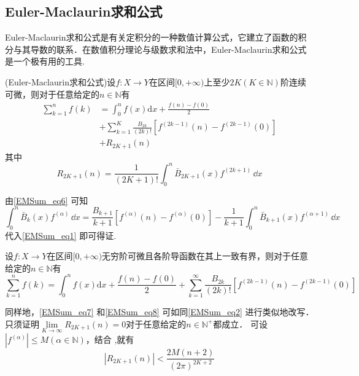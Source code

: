 \subsection{Euler-Maclaurin求和公式}

Euler-Maclaurin求和公式是有关定积分的一种数值计算公式，它建立了函数的积分与其导数的联系．在数值积分理论与级数求和法中，Euler-Maclaurin求和公式是一个极有用的工具.

\begin{theorem}{}
(Euler-Maclaurin求和公式)设$f:X\to Y$在区间$[0,+\infty)$上至少$2K(K\in{\mathbb N})$阶连续可微，则对于任意给定的$n\in\mathbb N$有
\begin{equation}\label{EMSum_eq7}
\begin{aligned}
    \sum_{k=1}^{n}f(k)&=\int_{0}^{n}f(x)\mathrm{d}x+\frac{f(n)-f(0)}{2}\\
    &+\sum_{k=1}^{K}\frac{B_{2k}}{(2k)!}[f^{(2k-1)}(n)-f^{(2k-1)}(0)]\\
    &+R_{2K+1}(n)
\end{aligned}
\end{equation}
其中
\begin{equation}
    R_{2K+1}(n)=\frac{1}{(2K+1)!}\int_{0}^{n}\bar{B}_{2K+1}(x)f^{(2k+1)}\,\dd x
\end{equation}
\end{theorem}
由\autoref{EMSum_eq6} 可知
\begin{equation}
    \int_{0}^{n}\bar{B}_{k}(x)f^{(\alpha)}\,\dd x
    =\frac{B_{k+1}}{k+1}[f^{(\alpha)}(n)-f^{(\alpha)}(0)]
    -\frac{1}{k+1}\int_{0}^{n}\bar{B}_{k+1}(x)f^{(\alpha+1)}\,\dd x
\end{equation}
 代入\autoref{EMSum_eq1} 即可得证.
\begin{theorem}{}
设$f:X\to Y$在区间$[0,+\infty)$无穷阶可微且各阶导函数在其上一致有界，则对于任意给定的$n\in\mathbb N$有
\begin{equation}\label{EMSum_eq8}
    \sum_{k=1}^{n}f(k)=\int_{0}^{n}f(x)\mathrm{d}x+\frac{f(n)-f(0)}{2}
    +\sum_{k=1}^{\infty}\frac{B_{2k}}{(2k)!}[f^{(2k-1)}(n)-f^{(2k-1)}(0)]
\end{equation}
\end{theorem}
同样地，\autoref{EMSum_eq7} 和\autoref{EMSum_eq8} 可如同\autoref{EMSum_eq2} 进行类似地改写．
只须证明$\lim\limits_{K\to\infty}R_{2K+1}(n)=0$对于任意给定的$n\in{\mathbb N^{+}}$都成立．
可设$|f^{(\alpha)}|\leqslant M(\alpha\in{\mathbb N})$，结合 ,就有
\begin{equation}
        |R_{2K+1}(n)|<\frac{2M(n+2)}{(2\pi)^{2K+2}}
\end{equation}
